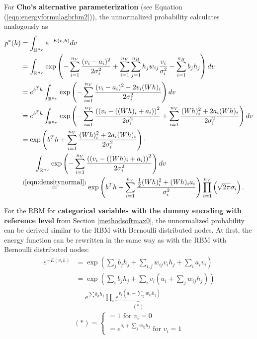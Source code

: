 \documentclass[12pt]{article}
\newcommand{\intrnv}{\int_{\mathbb{R}^{n_{\scaleto{V}{2.5pt}}}}}
\begin{document}
For {\bf Cho's alternative parameterization} (see Equation (\ref{eqn:energyformulagbrbm2})), the unnormalized probability calculates analogously as
\begingroup
\allowdisplaybreaks
\begin{align*}
   p^*(h) &= \intrnv e^{-E \left(v,h \right)} dv \\
   &= \intrnv \exp \left( - \sum_{i=1}^{n_V} \frac{(v_i - a_i)^2}{2\sigma_i^2} + \sum_{i=1}^{n_V} \sum_{j=1}^{n_H} h_j w_{ij} \frac{v_i}{\sigma_i^2} - \sum_{i=1}^{n_H} b_j h_j \right) dv \\
   &= e^{b^T h} \intrnv \exp\left( - \sum_{i=1}^{n_V} \frac{(v_i - a_i)^2 - 2 v_i (Wh)_i}{2 \sigma_i^2} \right) dv \\
   &= e^{b^T h} \intrnv \exp \left( - \sum_{i=1}^{n_V} \frac{\left((v_i - ((Wh)_i + a_i) \right)^2}{2 \sigma_i^2}  + \sum_{i=1}^{n_V} \frac{(Wh)_i^2 + 2 a_i (Wh)_i}{2\sigma_i^2} \right) dv\\
   &= \exp \left( b^T h + \sum_{i=1}^{n_V} \frac{(Wh)_i^2 + 2 a_i (Wh)_i}{2\sigma_i^2} \right) \cdot \\
   & \quad \quad \intrnv \exp \left(- \sum_{i=1}^{n_V} \frac{\left((v_i - ((Wh)_i + a_i) \right)^2}{2 \sigma_i^2} \right) dv\\
   &\stackrel{(\ref{eqn:densitynormal})}{=} \exp \left( b^T h + \sum_{i=1}^{n_V} \frac{\frac{1}{2}(Wh)_i^2 + (Wh)_i a_i}{\sigma_i^2} \right ) \prod_{i=1}^{n_V}\left(\sqrt{2\pi} \sigma_i \right).
\end{align*}
\endgroup

For the RBM for {\bf categorical variables with the dummy encoding with reference level} from Section \ref{methodsoftmax0}, the unnormalized probability can be derived similar to the RBM with Bernoulli distributed nodes. At first, the energy function can be rewritten in the same way as with the RBM with Bernoulli distributed nodes:
\begin{align}
e^{-E(v,h)} &= \exp \left(\sum_j b_j h_j + \sum_{i,j} w_{ij} v_i h_j + \sum_i a_i v_i \right) \nonumber \\
&= \exp \left( \sum_i b_j h_j + \sum_i v_i \left( a_i + \sum_j w_{ij} h_j \right) \right) \nonumber \\
&= e^{\sum b_h h_j} \prod_i \underbrace{e^{v_i (a_i + \sum_j w_{ij} h_j)}}_{(*)}
\label{eqn:freeenergytrick}
\end{align}
\begin{equation*}
(*) = \left\{
\begin{array}{l}
 =1 \text{ for } v_i = 0 \\
 = e^{a_i +\sum_j w_{ij} h_j} \text{ for } v_i = 1
\end{array} \right.
\end{equation*}
\end{document}
